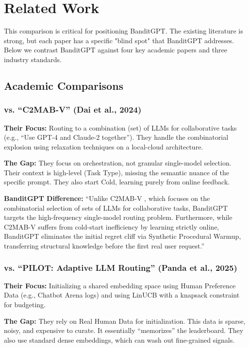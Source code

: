 \section{Related Work}

This comparison is critical for positioning BanditGPT. The existing literature is strong, but each paper has a specific "blind spot" that BanditGPT addresses. Below we contrast BanditGPT against four key academic papers and three industry standards.

\subsection{Academic Comparisons}

\subsubsection{vs. ``C2MAB-V'' (Dai et al., 2024)}
\noindent \textbf{Their Focus:} Routing to a combination (set) of LLMs for collaborative tasks (e.g., ``Use GPT-4 and Claude-2 together''). They handle the combinatorial explosion using relaxation techniques on a local-cloud architecture.

\noindent \textbf{The Gap:} They focus on orchestration, not granular single-model selection. Their context is high-level (Task Type), missing the semantic nuance of the specific prompt. They also start Cold, learning purely from online feedback.

\noindent \textbf{BanditGPT Difference:}
``Unlike C2MAB-V \cite{dai2024c2mabv}, which focuses on the combinatorial selection of sets of LLMs for collaborative tasks, BanditGPT targets the high-frequency single-model routing problem. Furthermore, while C2MAB-V suffers from cold-start inefficiency by learning strictly online, BanditGPT eliminates the initial regret cliff via Synthetic Procedural Warmup, transferring structural knowledge before the first real user request.''

\subsubsection{vs. ``PILOT: Adaptive LLM Routing'' (Panda et al., 2025)}
\noindent \textbf{Their Focus:} Initializing a shared embedding space using Human Preference Data (e.g., Chatbot Arena logs) and using LinUCB with a knapsack constraint for budgeting.

\noindent \textbf{The Gap:} They rely on Real Human Data for initialization. This data is sparse, noisy, and expensive to curate. It essentially ``memorizes'' the leaderboard. They also use standard dense embeddings, which can wash out fine-grained signals.

